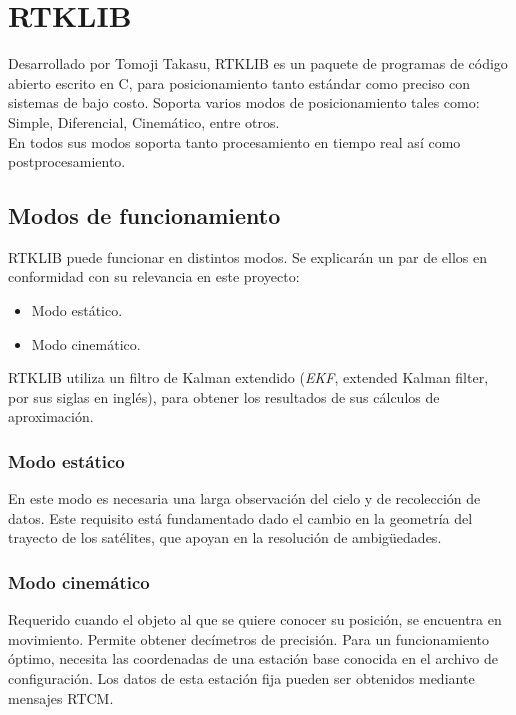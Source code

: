 
\section{RTKLIB}

Desarrollado por Tomoji Takasu, RTKLIB es un paquete de programas de código abierto escrito en C, para posicionamiento tanto estándar como preciso con sistemas de bajo costo. Soporta varios modos de posicionamiento tales como: Simple, Diferencial, Cinemático, entre otros. \\

En todos sus modos soporta tanto procesamiento en tiempo real así como postprocesamiento\cite{takasu2009development}.

\subsection{Modos de funcionamiento}

RTKLIB puede funcionar en distintos modos. Se explicarán un par de ellos en conformidad con su relevancia en este proyecto:

\begin{itemize}
\item Modo estático.
\item Modo cinemático.
\end{itemize}

RTKLIB utiliza un filtro de Kalman extendido (\textit{EKF}, extended Kalman filter, por sus siglas en inglés), para obtener los resultados de sus cálculos de aproximación. 

\subsubsection{Modo estático}
En este modo es necesaria una larga observación del cielo y de recolección de datos. Este requisito está fundamentado dado el cambio en la geometría del trayecto de los satélites, que apoyan en la resolución de ambigüedades\cite{wisniewski2013evaluation}.

\subsubsection{Modo cinemático}
Requerido cuando el objeto al que se quiere conocer su posición, se encuentra en movimiento. Permite obtener decímetros de precisión. Para un funcionamiento óptimo, necesita las coordenadas de una estación base conocida en el archivo de configuración. Los datos de esta estación fija pueden ser obtenidos mediante mensajes RTCM\cite{wisniewski2013evaluation}.

